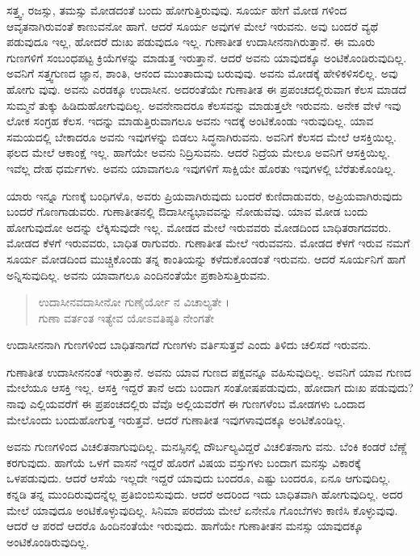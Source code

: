 ಸತ್ತ್ವ, ರಜಸ್ಸು, ತಮಸ್ಸು ಮೋಡದಂತೆ ಬಂದು ಹೋಗುತ್ತಿರುವುವು. ಸೂರ್ಯ ಹೇಗೆ ಮೋಡ ಗಳಿಂದ ಆವೃತನಾಗಿರುವಂತೆ ಕಾಣುವನೋ ಹಾಗೆ. ಆದರೆ ಸೂರ್ಯ ಅವುಗಳ ಮೇಲೆ ಇರುವನು. ಅವು ಬಂದರೆ ವ್ಯಥೆ ಪಡುವುದೂ ಇಲ್ಲ, ಹೋದರೆ ದುಃಖ ಪಡುವುದೂ ಇಲ್ಲ. ಗುಣಾತೀತ ಉದಾಸೀನನಾಗಿರುತ್ತಾನೆ. ಈ ಮೂರು ಗುಣಗಳಿಗೆ ಸಂಬಂಧಪಟ್ಟ ಕ್ರಿಯೆಗಳನ್ನು ಮಾಡುತ್ತ ಇರುತ್ತಾನೆ. ಆದರೆ ಅವನು ಯಾವುದಕ್ಕೂ ಅಂಟಿಕೊಂಡಿರುವುದಿಲ್ಲ. ಅವನಿಗೆ ಸತ್ತ್ವಗುಣದ ಜ್ಞಾನ, ಶಾಂತಿ, ಆನಂದ ಮುಂತಾದುವು ಬರುವುವು. ಅವನು ಮೋಡಕ್ಕೆ ಹೇಳಿಕಳಿಸಲಿಲ್ಲ. ಅವು ಹೋಗು ವುವು. ಅವನು ಎರಡಕ್ಕೂ ಉದಾಸೀನ. ಅದರಂತೆಯೇ ಗುಣಾತೀತ ಈ ಪ್ರಪಂಚದಲ್ಲಿರುವಾಗ ಕೆಲಸ ಮಾಡದೆ ಸುಮ್ಮನೆ ತುಕ್ಕು ಹಿಡಿದುಹೋಗುವುದಿಲ್ಲ. ಅವನೇನಾದರೂ ಕೆಲಸವನ್ನು ಮಾಡುತ್ತಲೇ ಇರುವನು. ಅನೇಕ ವೇಳೆ ಇವು ಲೋಕ ಸಂಗ್ರಹ ಕೆಲಸ. ಇದನ್ನು ಮಾಡುತ್ತಿರುವಾಗಲೂ ಅವನು ಇದಕ್ಕೆ ಅಂಟಿಕೊಂಡು ಇರುವುದಿಲ್ಲ. ಯಾವ ಸಮಯದಲ್ಲಿ ಬೇಕಾದರೂ ಅವನು ಇವುಗಳನ್ನು ಬಿಡಲು ಸಿದ್ಧನಾಗಿರುವನು. ಅವನಿಗೆ ಕೆಲಸದ ಮೇಲೆ ಆಸಕ್ತಿಯಿಲ್ಲ. ಫಲದ ಮೇಲೆ ಆಕಾಂಕ್ಷೆ ಇಲ್ಲ. ಹಾಗೆಯೇ ಅವನು ನಿದ್ರಿಸುವನು. ಆದರೆ ನಿದ್ರೆಯ ಮೇಲೂ ಅವನಿಗೆ ಆಸಕ್ತಿಯಿಲ್ಲ. ಇವೆಲ್ಲ ದೇಹ ಧರ್ಮಗಳು. ಅವನು ಯಾವಾಗಲೂ ಇವುಗಳಿಗೆ ಸಾಕ್ಷಿಯೇ ಹೊರತು ಇವುಗಳಲ್ಲಿ ಬೆರೆತುಕೊಂಡಿಲ್ಲ.

ಯಾರು ಇನ್ನೂ ಗುಣಕ್ಕೆ ಬಂಧಿಗಳೊ, ಅವರು ಪ್ರಿಯವಾಗಿರುವುದು ಬಂದರೆ ಕುಣಿದಾಡುವರು, ಅಪ್ರಿಯವಾಗಿರುವುದು ಬಂದರೆ ಗೊಣಗಾಡುವರು. ಗುಣಾತೀತನಲ್ಲಿ ಔದಾಸೀನ್ಯಭಾವವನ್ನು ನೋಡುವೆವು. ಯಾವ ಮೋಡ ಬಂದು ಹೋಗುವುದೋ ಅದನ್ನು ಲೆಕ್ಕಿಸುವುದೇ ಇಲ್ಲ. ಮೋಡದ ಮೇಲೆ ಇರುವವರು ಮೋಡದಿಂದ ಬಾಧಿತರಾಗದವರು. ಮೋಡದ ಕೆಳಗೆ ಇರುವವರು, ಬಾಧಿತ ರಾಗುವರು. ಗುಣಾತೀತ ಮೇಲೆ ಇರುವವನು. ಮೋಡದ ಕೆಳಗೆ ಇರುವ ನಮಗೆ ಸೂರ್ಯ ಮೋಡದಿಂದ ಮುಚ್ಚಿಕೊಂಡು ತನ್ನ ಕಾಂತಿಯನ್ನು ಕಳೆದುಕೊಂಡಂತೆ ಇರುವನು. ಆದರೆ ಸೂರ್ಯನಿಗೆ ಹಾಗೆ ಅನ್ನಿಸುವುದಿಲ್ಲ. ಅವನು ಯಾವಾಗಲೂ ಎಂದಿನಂತೆಯೇ ಪ್ರಕಾಶಿಸುತ್ತಿರುವನು.

\begin{verse}
ಉದಾಸೀನವದಾಸೀನೋ ಗುಣೈರ್ಯೋ ನ ವಿಚಾಲ್ಯತೇ ।\\ಗುಣಾ ವರ್ತಂತ ಇತ್ಯೇವ ಯೋಽವತಿಷ್ಠತಿ ನೇಂಗತೇ 
\end{verse}

{\small ಉದಾಸೀನನಾಗಿ ಗುಣಗಳಿಂದ ಬಾಧಿತನಾಗದೆ ಗುಣಗಳು ವರ್ತಿಸುತ್ತವೆ ಎಂದು ತಿಳಿದು ಚಲಿಸದೆ ಇರುವನು.}

ಗುಣಾತೀತ ಉದಾಸೀನನಂತೆ ಇರುತ್ತಾನೆ. ಅವನು ಯಾವ ಗುಣದ ಪಕ್ಷವನ್ನೂ ವಹಿಸುವುದಿಲ್ಲ. ಅವನಿಗೆ ಯಾವ ಗುಣದ ಮೇಲೆಯೂ ಆಸಕ್ತಿ ಇಲ್ಲ. ಆಸಕ್ತಿ ಇದ್ದರೆ ತಾನೆ ಅದು ಬಂದಾಗ ಸಂತೋಷಪಡುವುದು, ಹೋದಾಗ ದುಃಖ ಪಡುವುದು? ನಾವು ಎಲ್ಲಿಯವರೆಗೆ ಈ ಪ್ರಪಂಚದಲ್ಲಿರು ವೆವೊ ಅಲ್ಲಿಯವರೆಗೆ ಈ ಗುಣಗಳೆಂಬ ಮೋಡಗಳು ಒಂದಾದ ಮೇಲೊಂದು ಬಂದುಹೋಗುತ್ತ ಇರುತ್ತವೆ. ಆದರೆ ಗುಣಾತೀತ ಇವುಗಳಾವುದಕ್ಕೂ ಅಂಟಿಕೊಂಡಿಲ್ಲ.

ಅವನು ಗುಣಗಳಿಂದ ವಿಚಲಿತನಾಗುವುದಿಲ್ಲ. ಮನಸ್ಸಿನಲ್ಲಿ ದೌರ್ಬಲ್ಯವಿದ್ದರೆ ವಿಚಲಿತನಾಗು ವನು. ಬೆಂಕಿ ಕಂಡರೆ ಬೆಣ್ಣೆ ಕರಗುವುದು. ಹಾಗೆಯೆ ಒಳಗೆ ವಾಸನೆ ಇದ್ದರೆ ಹೊರಗೆ ವಿಷಯ ವಸ್ತುಗಳು ಬಂದಾಗ ಮನಸ್ಸು ವಿಕಾರಕ್ಕೆ ಒಳಪಡುವುದು. ಆದರೆ ಆಸೆಯೆ ಇಲ್ಲದೇ ಇದ್ದರೆ ಯಾವುದು ಬಂದರೂ, ಎಷ್ಟು ಬಂದರೂ, ಏನೂ ಆಗುವುದಿಲ್ಲ. ಕನ್ನಡಿ ತನ್ನ ಮುಂದಿರುವುದನ್ನೆಲ್ಲ ಪ್ರತಿಬಿಂಬಿಸುವುದು. ಆದರೆ ಅದರಿಂದ ಇದು ಬಾಧಿತವಾಗಿ ಹೋಗುವುದಿಲ್ಲ. ಅದರ ಮೇಲೆ ಯಾವುದೂ ಅಂಟಿಕೊಳ್ಳುವುದಿಲ್ಲ. ಸಿನಿಮಾ ಪರದೆಯ ಮೇಲೆ ಏನೇನೊ ಗೊಂಬೆಗಳು ಕಾಣಿಸಿ ಕೊಳ್ಳುವುವು. ಆದರೆ ಆ ಪರದೆ ಆದರೊ ಹಿಂದಿನಂತೆಯೇ ಇರುವುದು. ಹಾಗೆಯೇ ಗುಣಾತೀತನ ಮನಸ್ಸು ಯಾವುದಕ್ಕೂ ಅಂಟಿಕೊಂಡಿರುವುದಿಲ್ಲ.

